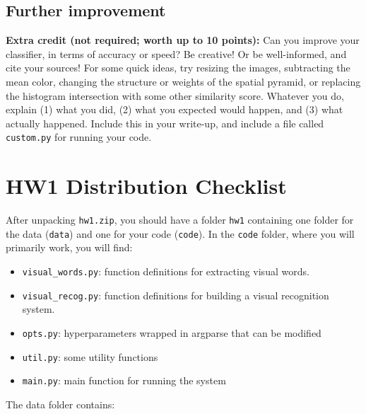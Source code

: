 \documentclass[10pt]{article}
\begin{document}
\subsection{Further improvement}

{\bf Extra credit (not required; worth up to 10 points):} Can you improve your classifier, in terms of accuracy or speed? Be creative! Or be well-informed, and cite your sources! For some quick ideas, try resizing the images, subtracting the mean color, changing the structure or weights of the spatial pyramid, or replacing the histogram intersection with some other similarity score. Whatever you do, explain (1) what you did, (2) what you expected would happen, and (3) what actually happened. Include this in your write-up, and include a file called {\tt custom.py} for running your code.


\section{HW1 Distribution Checklist}
\label{sec:Manifest}
After unpacking {\tt hw1.zip}, you should have a folder {\tt hw1} containing
one folder for the data ({\tt data}) and one for your code ({\tt code}).
In the {\tt code} folder, where you will primarily work, you will find:
\begin{itemize}
\item {\tt visual\_words.py}: function definitions for extracting visual words.
\item {\tt visual\_recog.py}: function definitions for building a visual recognition system.
\item {\tt opts.py}: hyperparameters wrapped in argparse that can be modified
\item {\tt util.py}: some utility functions
\item {\tt main.py}: main function for running the system

\end{itemize}

The data folder contains:
\end{document}
